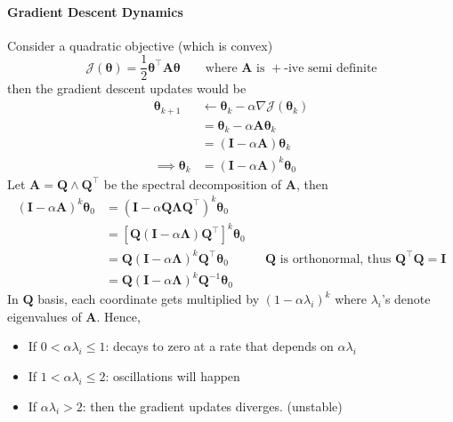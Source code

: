 \documentclass[11pt]{article}
\begin{document}
\paragraph{Gradient Descent Dynamics}
Consider a quadratic objective (which is convex)
\begin{equation}
    \mathcal{J}(\boldsymbol{\theta})=\frac{1}{2} \boldsymbol{\theta}^{\top} \boldsymbol{A} \boldsymbol{\theta} \quad\quad \text{where $\mathbf{A}$ is $+$-ive semi definite}
\end{equation}
then the gradient descent updates would be 
\begin{align}
    \boldsymbol{\theta}_{k + 1} 
    &\gets \boldsymbol{\theta}_k - \alpha \nabla \mathcal{J} (\boldsymbol{\theta}_k) \\
    &= \boldsymbol{\theta}_k - \alpha \mathbf{A} \boldsymbol{\theta}_k \\
    &= (\mathbf{I} - \alpha \mathbf{A})\boldsymbol{\theta}_k \\
    \implies \boldsymbol{\theta}_k &= (\mathbf{I} - \alpha \mathbf{A})^k \boldsymbol{\theta}_0
\end{align}
Let $\mathbf{A} = \mathbf{Q} \wedge \mathbf{Q}^{\top}$ be the spectral decomposition of $\mathbf{A}$, then
\begin{align}
    (\mathbf{I}-\alpha \mathbf{A})^{k} \boldsymbol{\theta}_{0}
    &=\left(\mathbf{I}-\alpha \mathbf{Q} \mathbf{\Lambda} \mathbf{Q}^{\top}\right)^{k} \boldsymbol{\theta}_{0} \\
    &=\left[\mathbf{Q}(\mathbf{I}-\alpha \boldsymbol{\Lambda}) \mathbf{Q}^{\top}\right]^{k} \boldsymbol{\theta}_{0} \\
    &= \mathbf{Q}(\mathbf{I}-\alpha \boldsymbol{\Lambda})^{k} \mathbf{Q}^{\top} \boldsymbol{\theta}_{0} && \text{$\mathbf{Q}$ is orthonormal, thus $\mathbf{Q}^\top\mathbf{Q} = \mathbf{I}$} \\
    &= \mathbf{Q}(\mathbf{I}-\alpha \boldsymbol{\Lambda})^{k} \mathbf{Q}^{-1} \boldsymbol{\theta}_{0}
\end{align}
In $\mathbf{Q}$ basis, each coordinate gets multiplied by $\left(1-\alpha \lambda_{i}\right)^{k}$ where $\lambda_i$'s denote eigenvalues of $\mathbf{A}$. Hence, 
\begin{itemize}
    \item If $0 < \alpha \lambda_i \leq 1$: decays to zero at a rate that depends on $\alpha \lambda_i$
    \item If $1 < \alpha \lambda_i \leq 2$: oscillations will happen
    \item If $\alpha \lambda_i > 2$: then the gradient updates diverges. (unstable)
\end{itemize}
\end{document}
